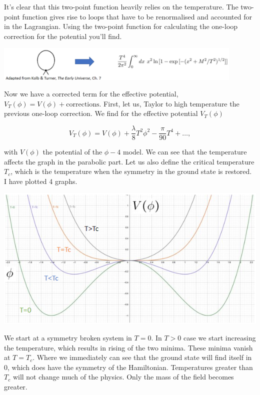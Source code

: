 \documentclass{article}
\numberwithin{equation}{section}
\begin{document}
It's clear that this two-point function heavily relies on the temperature.
The two-point function gives rise to loops that have to be renormalised and accounted for in the Lagrangian.
Using the two-point function for calculating the one-loop correction for the potential you'll find.

\begin{center}
\includegraphics[width=450px]{Knipsel4.PNG}    
\end{center}

Now we have a corrected term for the effective potential, $V_T(\phi)=V(\phi)+\text{corrections}$.
First, let us, Taylor to high temperature the previous one-loop correction.
We find for the effective potential $V_T(\phi)$

\begin{equation}
    V_T(\phi)=V(\phi)+\frac{\lambda}{8}T^2\phi^2-\frac{\pi}{90}T^4+\dots,
\end{equation}

with $V(\phi)$ the potential of the $\phi-4$ model.
We can see that the temperature affects the graph in the parabolic part.
Let us also define the critical temperature $T_c$, which is the temperature when the symmetry in the ground state is restored.
I have plotted 4 graphs.


\begin{center}
    
\includegraphics[]{graphTrestoration.PNG}

\end{center}

We start at a symmetry broken system in $T=0$. In $T>0$ case we start increasing the temperature, which results in rising of the two minima.
These minima vanish at $T=T_c$.
Where we immediately can see that the ground state will find itself in 0, which does have the symmetry of the Hamiltonian.
Temperatures greater than $T_c$ will not change much of the physics. 
Only the mass of the field becomes greater.
\end{document}
